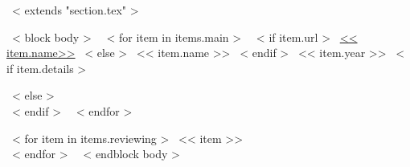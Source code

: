 ~< extends "section.tex" >~

~< block body >~
  ~< for item in items.main >~
    ~< if item.url >~
      \href{<< item.url >>}{<< item.name>>}
    ~< else >~
      << item.name >>
    ~< endif >~
    \hfill << item.year >>
    ~< if item.details >~
      \\ {\scriptsize \color{gray}{<< item.details >>} \par}
    ~< else >~
      \\[3mm]
    ~< endif >~
  ~< endfor >~

~< for item in items.reviewing >~
<< item >> \\
~< endfor >~
~< endblock body >~